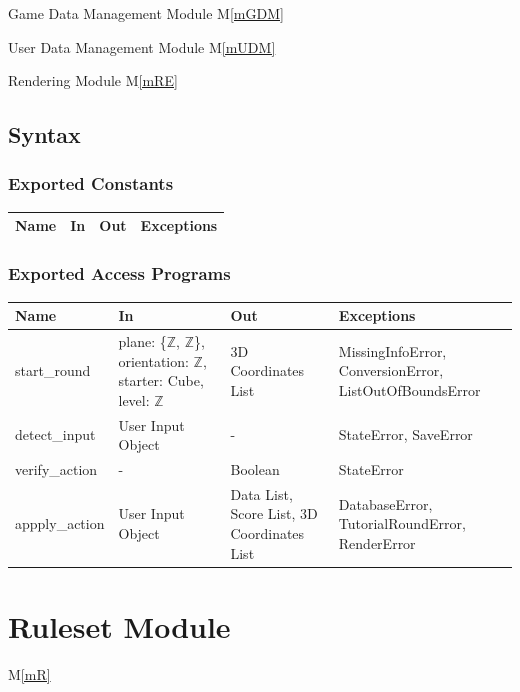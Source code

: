 \documentclass[12pt, titlepage]{article}
\newcommand{\mref}[1]{M\ref{#1}}
\begin{document}
 Game Data Management Module \mref{mGDM}

 User Data Management Module \mref{mUDM}

 Rendering Module \mref{mRE}


\subsection{Syntax}

\subsubsection{Exported Constants}

\begin{center}
\begin{tabular}{p{4cm} p{4cm} p{4cm} p{4cm}}
\hline
\textbf{Name} & \textbf{In} & \textbf{Out} & \textbf{Exceptions} \\
\hline


\hline
\end{tabular}
\end{center}

\subsubsection{Exported Access Programs}

\begin{center}
\begin{tabular}{p{4cm} p{4cm} p{4cm} p{4cm}}
\hline
\textbf{Name} & \textbf{In} & \textbf{Out} & \textbf{Exceptions} \\
\hline
start\_round & plane: \{$\mathbb{Z}$, $\mathbb{Z}$\}, orientation: $\mathbb{Z}$, starter: Cube, level: $\mathbb{Z}$ & 3D Coordinates List & MissingInfoError, ConversionError, ListOutOfBoundsError \\
detect\_input & User Input Object & - & StateError, SaveError \\
verify\_action & - & Boolean & StateError \\
appply\_action & User Input Object & Data List, Score List, 3D Coordinates List & DatabaseError, TutorialRoundError, RenderError \\

\hline
\end{tabular}
\end{center}


\newpage

\section{Ruleset Module} \mref{mR} 
\end{document}
